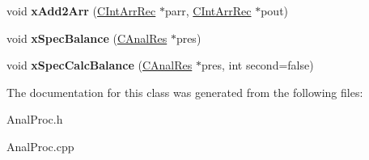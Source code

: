 \begin{DoxyCompactItemize}
\item 
\hypertarget{class_c_anal_proc_a99391405db90f3407a210511922aec98}{void {\bfseries x\-Add2\-Arr} (\hyperlink{class_c_int_arr_rec}{C\-Int\-Arr\-Rec} $\ast$parr, \hyperlink{class_c_int_arr_rec}{C\-Int\-Arr\-Rec} $\ast$pout)}\label{class_c_anal_proc_a99391405db90f3407a210511922aec98}

\item 
\hypertarget{class_c_anal_proc_a72acb647d683d6924b6e1a9a18923d97}{void {\bfseries x\-Spec\-Balance} (\hyperlink{class_c_anal_res}{C\-Anal\-Res} $\ast$pres)}\label{class_c_anal_proc_a72acb647d683d6924b6e1a9a18923d97}

\item 
\hypertarget{class_c_anal_proc_af06df23fdce28286797885cceb974b47}{void {\bfseries x\-Spec\-Calc\-Balance} (\hyperlink{class_c_anal_res}{C\-Anal\-Res} $\ast$pres, int second=false)}\label{class_c_anal_proc_af06df23fdce28286797885cceb974b47}

\end{DoxyCompactItemize}


The documentation for this class was generated from the following files\-:\begin{DoxyCompactItemize}
\item 
Anal\-Proc.\-h\item 
Anal\-Proc.\-cpp\end{DoxyCompactItemize}

